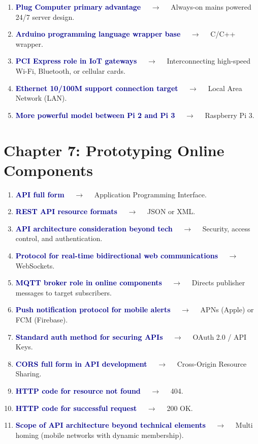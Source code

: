 \documentclass[11pt,a4paper]{article}
\begin{document}
\begin{enumerate}[label=\arabic*., leftmargin=*, labelsep=0.8em, itemsep=0.35em, parsep=0.1em, topsep=0.2em]
  \item \textcolor{darkblue}{\textbf{Plug Computer primary advantage}} $\quad\to\quad$ Always-on mains powered 24/7 server design.
  \item \textcolor{darkblue}{\textbf{Arduino programming language wrapper base}} $\quad\to\quad$ C/C++ wrapper.
  \item \textcolor{darkblue}{\textbf{PCI Express role in IoT gateways}} $\quad\to\quad$ Interconnecting high-speed Wi-Fi, Bluetooth, or cellular cards.
  \item \textcolor{darkblue}{\textbf{Ethernet 10/100M support connection target}} $\quad\to\quad$ Local Area Network (LAN).
  \item \textcolor{darkblue}{\textbf{More powerful model between Pi 2 and Pi 3}} $\quad\to\quad$ Raspberry Pi 3.
\end{enumerate}

\section*{Chapter 7: Prototyping Online Components}

\begin{enumerate}[label=\arabic*., leftmargin=*, labelsep=0.8em, itemsep=0.35em, parsep=0.1em, topsep=0.2em]
  \item \textcolor{darkblue}{\textbf{API full form}} $\quad\to\quad$ Application Programming Interface.
  \item \textcolor{darkblue}{\textbf{REST API resource formats}} $\quad\to\quad$ JSON or XML.
  \item \textcolor{darkblue}{\textbf{API architecture consideration beyond tech}} $\quad\to\quad$ Security, access control, and authentication.
  \item \textcolor{darkblue}{\textbf{Protocol for real-time bidirectional web communications}} $\quad\to\quad$ WebSockets.
  \item \textcolor{darkblue}{\textbf{MQTT broker role in online components}} $\quad\to\quad$ Directs publisher messages to target subscribers.
  \item \textcolor{darkblue}{\textbf{Push notification protocol for mobile alerts}} $\quad\to\quad$ APNs (Apple) or FCM (Firebase).
  \item \textcolor{darkblue}{\textbf{Standard auth method for securing APIs}} $\quad\to\quad$ OAuth 2.0 / API Keys.
  \item \textcolor{darkblue}{\textbf{CORS full form in API development}} $\quad\to\quad$ Cross-Origin Resource Sharing.
  \item \textcolor{darkblue}{\textbf{HTTP code for resource not found}} $\quad\to\quad$ 404.
  \item \textcolor{darkblue}{\textbf{HTTP code for successful request}} $\quad\to\quad$ 200 OK.
  \item \textcolor{darkblue}{\textbf{Scope of API architecture beyond technical elements}} $\quad\to\quad$ Multi homing (mobile networks with dynamic membership).
\end{enumerate}
\end{document}
